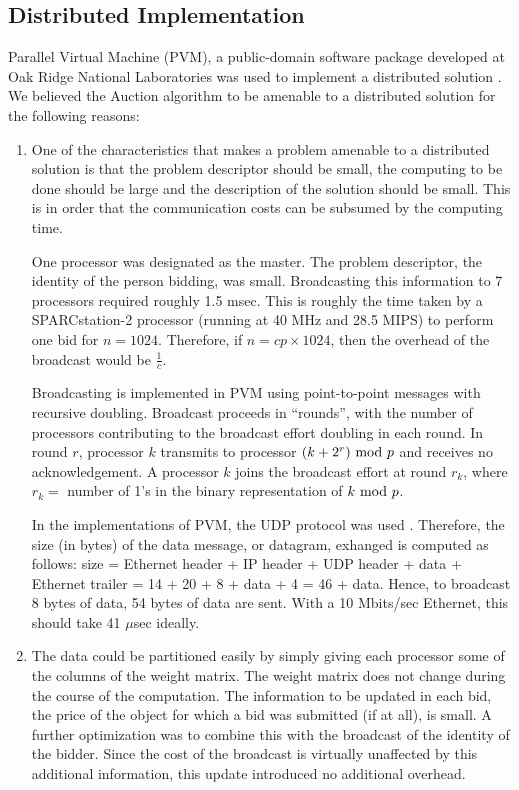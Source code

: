 \subsection{Distributed Implementation}
\label{dist}

Parallel Virtual Machine (PVM), a public-domain
software package developed at Oak Ridge National Laboratories
was used to implement a distributed solution \cite{sun91}.
We believed the Auction algorithm to be amenable to 
a distributed solution for the following reasons:
\begin{enumerate}

\item One of the characteristics that makes a problem amenable to
a distributed solution is that the problem descriptor should be
small, the computing to be done should be large and the description
of the solution should be small. This is in order that the
communication costs can be subsumed by the computing time.

One processor was designated as the master. The
problem descriptor, the identity of the person bidding,
was small. Broadcasting this information to 7 processors
required roughly 1.5 msec. 
This is roughly the time taken by a SPARCstation-2 processor 
(running at 40 MHz and 28.5 MIPS) to perform
one bid for $n = 1024$. Therefore, if $n = c p \times 1024$,
then the overhead of the broadcast would be $\frac{1}{c}$.

Broadcasting is implemented in PVM using point-to-point messages with
recursive doubling.  Broadcast proceeds in ``rounds'', with the
number of processors contributing to the broadcast effort doubling in each
round. In round $r$, processor $k$ transmits to processor 
$(k + 2^r)~{\rm mod}~p$ and receives no acknowledgement.
A processor $k$ joins the broadcast effort at round $r_k$, where
$r_k =$ number of 1's in the binary representation of $k~{\rm mod}~p$.

In the implementations of PVM, the UDP protocol was used \cite{po80}.
Therefore, the size (in bytes) of the data message, or 
datagram, exhanged is computed
as follows: size = Ethernet header + IP header + UDP header + data + Ethernet
trailer = 14 + 20 + 8 + data  + 4 = 46 + data. Hence, to broadcast
8 bytes of data, 54 bytes of data are sent. With a 10 Mbits/sec Ethernet,
this should take 41 $\mu$sec ideally.

\item The data could be partitioned easily by simply giving each 
processor some of the columns of the weight matrix. The weight
matrix does not change during the course of the computation.
The information to be updated in each bid, 
the price of the object for which a bid
was submitted (if at all), is small.
A further optimization was to combine this with the broadcast of
the identity of the bidder. Since the cost of the broadcast is virtually
unaffected by this additional information, this update introduced
no additional overhead. 


\end{enumerate}
